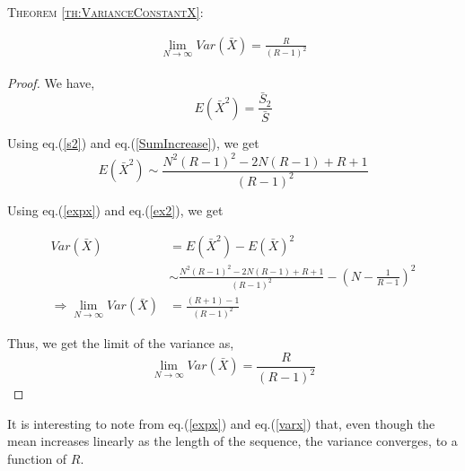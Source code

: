 \begin{multicols}{2}
\textsc{Theorem {\ref{th:VarianceConstantX}}:}

\vspace{-.7cm}

\begin{eqnarray*}
\lim_{N \rightarrow \infty} Var(\bar{X}) = \frac{R}{(R -1)^2}
\end{eqnarray*}

\vspace{-.4cm}

\begin{proof}\renewcommand{\qedsymbol}{}
We have,
\begin{equation}
E(\bar{X}^2) = \frac{\bar{S}_2}{\bar{S}}\label{eq-6.3}
\end{equation}

\vspace{-.2cm}

Using eq.(\ref{s2}) and eq.(\ref{SumIncrease}), we get
\begin{equation}
E(\bar{X}^2) \sim \frac{N^2(R-1)^2 - 2N(R-1) + R+1}{(R-1)^2}\label{eq-6.4}
\end{equation}

\vspace{-.3cm}

Using eq.(\ref{expx}) and eq.(\ref{ex2}), we get

\vspace{-.3cm}

{\fontsize{8}{9}\selectfont\begin{align*}
Var(\bar{X})&= E(\bar{X}^2)-E(\bar{X})^2\nonumber \\
&\sim \frac{N^2(R-1)^2 - 2N(R-1) + R+1}{(R-1)^2}-\left(N - \frac{1}{R-1}\right)^2\nonumber\\
\Rightarrow \lim_{N \rightarrow \infty}Var(\bar{X})& =  \frac{(R+1)-1}{(R-1)^2}\nonumber
\end{align*}}

\vspace{-.3cm}

Thus, we get the limit of the variance as,
\begin{equation}
\lim_{N \rightarrow \infty}Var(\bar{X}) = \frac{R}{(R-1)^2}\label{eq-6.5}
\end{equation}
\end{proof}

\vspace{-1cm}

It is interesting to note from eq.(\ref{expx}) and eq.(\ref{varx}) that, even though the mean increases linearly as the length of the sequence, the variance converges, to a function of $R$.


\end{multicols}
